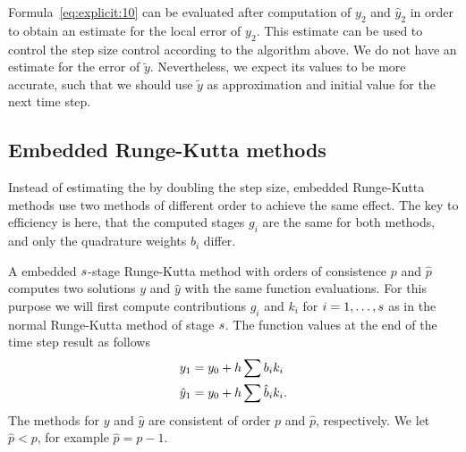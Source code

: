 \begin{remark}
  Formula~\eqref{eq:explicit:10} can be evaluated after computation of
  $y_2$ and $\hat y_2$ in order to obtain an estimate for the local
  error of $y_2$. This estimate can be used to control the step size
  control according to the algorithm above. We do not have an
  estimate for the error of $\tilde y$. Nevertheless, we expect its
  values to be more accurate, such that we should use $\tilde y$ as
  approximation and initial value for the next time step.
\end{remark}

\subsection{Embedded Runge-Kutta methods}
Instead of estimating the  by doubling the step size,
embedded Runge-Kutta methods use two methods of different order to
achieve the same effect. The key to efficiency is here, that the
computed stages $g_i$ are the same for both methods, and only the
quadrature weights $b_i$ differ.

\begin{definition}
   A embedded $s$-stage
  Runge-Kutta method with orders of consistence $p$ and $\hat p$
  computes two solutions $y$ and $\hat y$ with the same function
  evaluations. For this purpose we will first compute contributions
  $g_i$ and $k_i$ for $i=1,\dots,s$ as in the normal Runge-Kutta
  method of stage $s$. The function values at the end of the time
  step result as follows
  \begin{gather}
    \begin{split}
      y_1 &= y_0 + h \sum b_i k_i \\
      \hat y_1 &= y_0 + h \sum \hat {b}_i k_i.
    \end{split}
  \end{gather}
  The methods for $y$ and $\hat y$ are consistent of order $p$ and
  $\hat p$, respectively. We let $\hat p < p$, for example
  $\hat p = p-1$.
\end{definition}



